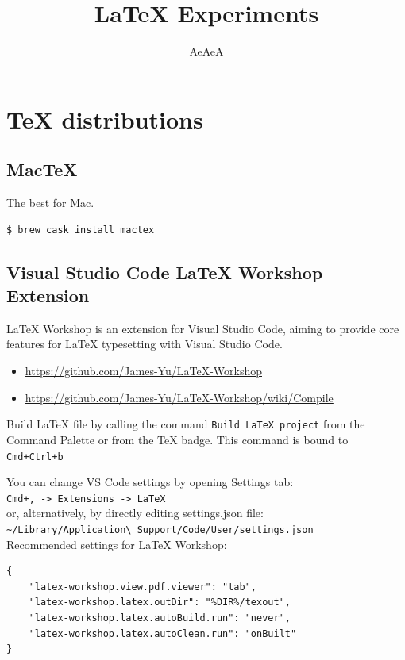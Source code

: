 \documentclass[letterpaper,dvipsnames]{article}
\title{\LaTeX{} Experiments}
\author{AeAeA}
\begin{document}
\maketitle

\section{TeX distributions}

\subsection{MacTeX}

The best for Mac.
\begin{verbatim}$ brew cask install mactex\end{verbatim}

\subsection{Visual Studio Code LaTeX Workshop Extension}

LaTeX Workshop is an extension for Visual Studio Code, aiming 
to provide core features for LaTeX typesetting with Visual Studio Code.
\begin{itemize}
    \item \url{https://github.com/James-Yu/LaTeX-Workshop}
    \item \url{https://github.com/James-Yu/LaTeX-Workshop/wiki/Compile}
\end{itemize}
Build LaTeX file by calling the command \verb|Build LaTeX project| from the\\
Command Palette or from the TeX badge. This command is bound to \\
\verb|Cmd+Ctrl+b|

You can change VS Code settings by opening Settings tab:\\ 
\verb|Cmd+, -> Extensions -> LaTeX| \\ 
or, alternatively, by directly editing settings.json file:\\ 
\verb|~/Library/Application\ Support/Code/User/settings.json| \\
Recommended settings for LaTeX Workshop:
\begin{verbatim}
{
    "latex-workshop.view.pdf.viewer": "tab",
    "latex-workshop.latex.outDir": "%DIR%/texout",
    "latex-workshop.latex.autoBuild.run": "never",
    "latex-workshop.latex.autoClean.run": "onBuilt"
}
\end{verbatim}
\end{document}
